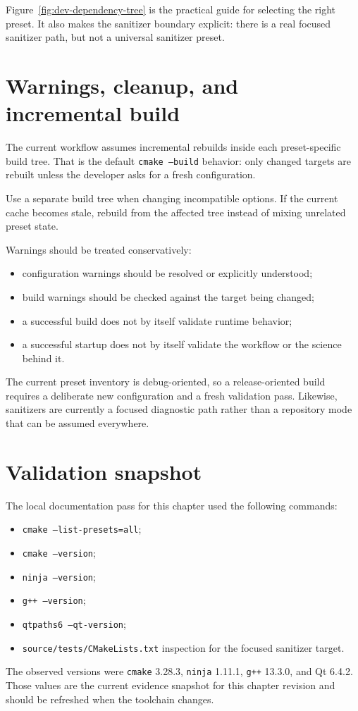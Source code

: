 Figure~\ref{fig:dev-dependency-tree} is the practical guide for selecting the
right preset. It also makes the sanitizer boundary explicit: there is a real
focused sanitizer path, but not a universal sanitizer preset.

\section{Warnings, cleanup, and incremental build}
\label{sec:dev-warnings-cleanup-incremental}

The current workflow assumes incremental rebuilds inside each preset-specific
build tree. That is the default \texttt{cmake --build} behavior: only changed
targets are rebuilt unless the developer asks for a fresh configuration.

Use a separate build tree when changing incompatible options. If the current
cache becomes stale, rebuild from the affected  tree
instead of mixing unrelated preset state.

Warnings should be treated conservatively:
\begin{itemize}
\item configuration warnings should be resolved or explicitly understood;
\item build warnings should be checked against the target being changed;
\item a successful build does not by itself validate runtime behavior;
\item a successful startup does not by itself validate the workflow or the
science behind it.
\end{itemize}

The current preset inventory is debug-oriented, so a release-oriented build
requires a deliberate new configuration and a fresh validation pass. Likewise,
sanitizers are currently a focused diagnostic path rather than a repository
mode that can be assumed everywhere.

\section{Validation snapshot}
\label{sec:dev-validation-snapshot}

The local documentation pass for this chapter used the following commands:
\begin{itemize}
\item \texttt{cmake --list-presets=all};
\item \texttt{cmake --version};
\item \texttt{ninja --version};
\item \texttt{g++ --version};
\item \texttt{qtpaths6 --qt-version};
\item \texttt{source/tests/CMakeLists.txt} inspection for the focused sanitizer target.
\end{itemize}

The observed versions were \texttt{cmake} 3.28.3, \texttt{ninja} 1.11.1,
\texttt{g++} 13.3.0, and Qt 6.4.2. Those values are the current evidence
snapshot for this chapter revision and should be refreshed when the toolchain
changes.
